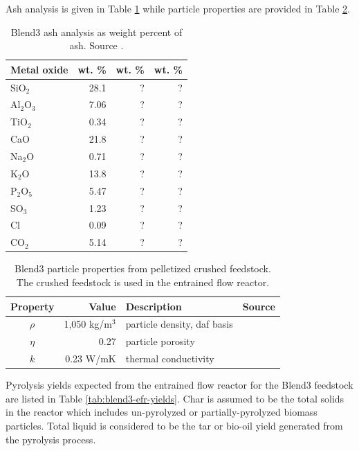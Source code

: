 Ash analysis is given in Table \ref{tab:blend3-ash-analysis} while particle properties are provided in Table \ref{tab:blend3-properties}.

\begin{table}[H]
    \centering
    \caption{Blend3 ash analysis as weight percent of ash. Source \cite{Choratch-2017}.}
    \label{tab:blend3-ash-analysis}
    \begin{tabular}{lrrr}
        \toprule
        Metal oxide & wt. \% & wt. \% & wt. \% \\
        \midrule
        SiO$_2$     & 28.1 & ? & ? \\
        Al$_2$O$_3$ & 7.06 & ? & ? \\
        TiO$_2$     & 0.34 & ? & ? \\
        CaO         & 21.8 & ? & ? \\
        Na$_2$O     & 0.71 & ? & ? \\
        K$_2$O      & 13.8 & ? & ? \\
        P$_2$O$_5$  & 5.47 & ? & ? \\
        SO$_3$      & 1.23 & ? & ? \\
        Cl          & 0.09 & ? & ? \\
        CO$_2$      & 5.14 & ? & ? \\
        \bottomrule
    \end{tabular}
\end{table}

\begin{table}[H]
    \centering
    \caption{Blend3 particle properties from pelletized crushed feedstock. The crushed feedstock is used in the entrained flow reactor.}
    \label{tab:blend3-properties}
    \begin{tabular}{crlc}
        \toprule
        Property & Value & Description & Source \\
        \midrule
        $\rho$  & 1,050 kg/m$^3$ & particle density, daf basis & \cite{Pecha-2018} \\
        $\eta$  & 0.27           & particle porosity & \\
        $k$     & 0.23 W/mK      & thermal conductivity & \\
        \bottomrule
    \end{tabular}
\end{table}

Pyrolysis yields expected from the entrained flow reactor for the Blend3 feedstock are listed in Table \ref{tab:blend3-efr-yields}. Char is assumed to be the total solids in the reactor which includes un-pyrolyzed or partially-pyrolyzed biomass particles. Total liquid is considered to be the tar or bio-oil yield generated from the pyrolysis process.

